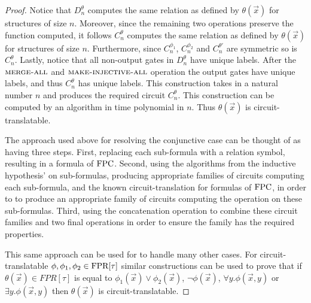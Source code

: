 \documentclass[../paper.tex]{subfiles}
\begin{document}
\begin{proof}
  Notice that $D^{\theta}_n$ computes the same relation as defined by
  $\theta(\vec{x})$ for structures of size $n$. Moreover, since the remaining
  two operations preserve the function computed, it follows $C^{\theta}_n$
  computes the same relation as defined by $\theta(\vec{x})$ for structures of
  size $n$. Furthermore, since $C^{\phi_1}_n$, $C^{\phi_2}_n$ and $C^{\theta'}_n$
  are symmetric so is $C^{\theta}_n$. Lastly, notice that all non-output gates
  in $D^{\theta}_n$ have unique labels. After the ${\normalfont\textsc{merge-all}}$ and
  ${\normalfont\textsc{make-injective-all}}$ operation the output gates have unique labels, and
  thus $C^{\theta}_n$ has unique labels. This construction takes in a natural
  number $n$ and produces the required circuit $C^{\theta}_n$. This construction
  can be computed by an algorithm in time polynomial in $n$. Thus
  $\theta(\vec{x})$ is circuit-translatable.

  The approach used above for resolving the conjunctive case can be thought of
  as having three steps. First, replacing each sub-formula with a relation
  symbol, resulting in a formula of $\text{\upshape FPC}$. Second, using the algorithms from
  the inductive hypothesis' on sub-formulas, producing appropriate families of
  circuits computing each sub-formula, and the known circuit-translation for
  formulas of $\text{\upshape FPC}$, in order to to produce an appropriate family of circuits
  computing the operation on these sub-formulas. Third, using the concatenation
  operation to combine these circuit families and two final operations in order
  to ensure the family has the required properties.
  
  This same approach can be used for to handle many other cases. For
  circuit-translatable $\phi, \phi_1, \phi_2 \in \text{\upshape FPR}[\tau]$ similar
  constructions can be used to prove that if $\theta(\vec{x}) \in FPR[\tau]$ is
  equal to $\phi_1(\vec{x}) \lor \phi_2(\vec{x})$, $\neg \phi(\vec{x})$,
  $\forall y. \phi (\vec{x}, y)$ or $\exists y. \phi (\vec{x}, y)$ then
  $\theta(\vec{x})$ is circuit-translatable.


\end{proof}
\end{document}
